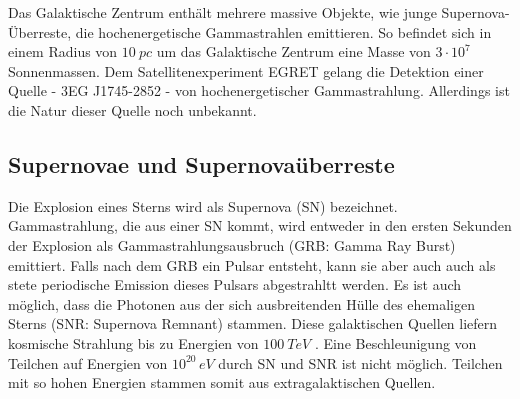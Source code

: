 Das Galaktische Zentrum enthält mehrere massive Objekte, wie junge Supernova-Überreste, die hochenergetische Gammastrahlen emittieren.
So befindet sich in einem Radius von $\SI{10}{pc}$ um das Galaktische Zentrum eine Masse von $3\cdot 10^7$ Sonnenmassen. 
Dem Satellitenexperiment EGRET gelang die Detektion einer Quelle - 3EG J1745-2852 - von hochenergetischer Gammastrahlung.
Allerdings ist die Natur dieser Quelle noch unbekannt.\cite{GalacticCenter}\cite{Weekes}





\subsection{Supernovae und Supernovaüberreste}
Die Explosion eines Sterns wird als Supernova (SN) bezeichnet.
Gammastrahlung, die aus einer SN kommt, wird entweder in den ersten Sekunden der Explosion als Gammastrahlungsausbruch (GRB: Gamma Ray Burst) emittiert.
Falls nach dem GRB ein Pulsar entsteht, kann sie aber auch auch als stete periodische Emission dieses Pulsars abgestrahltt werden.
Es ist auch möglich, dass die Photonen aus der sich ausbreitenden Hülle des ehemaligen Sterns (SNR: Supernova Remnant) stammen. 
Diese galaktischen Quellen liefern kosmische Strahlung bis zu Energien von $\SI{100}{TeV}$ \cite{Weekes}.
Eine Beschleunigung von Teilchen auf Energien von $10^{20}\,\si{eV}$ durch SN und SNR ist nicht möglich.
Teilchen mit so hohen Energien stammen somit aus extragalaktischen Quellen.\cite{Weekes}



